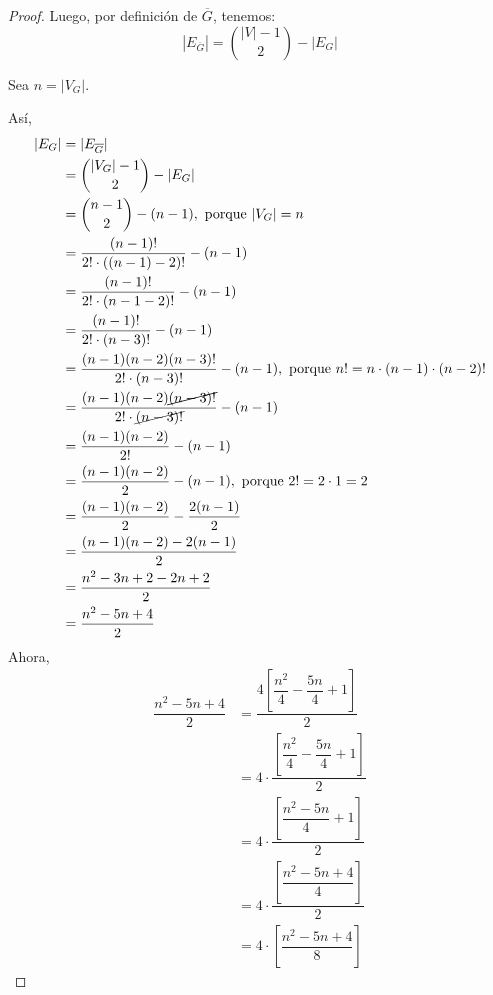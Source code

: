 \documentclass{article}
\begin{document}
\begin{enumerate}
\begin{enumerate}
\begin{proof}
          Luego, por definición de $\overline{G}$, tenemos:
          $$|E_{\overline{G}}| = \binom{|V| - 1}{2} - |E_{G}|$$

          Sea $n = |V_{G}|$.

          Así,
          \begin{align*}
            |E_{G}|
            & = |E_{\overline{G}}| \\
            & = \binom{|V_{G}| - 1}{2} - |E_{G}| \\
            & =  \binom{n - 1}{2} - (n - 1), \text{ porque $|V_{G}| = n$} \\
            & = \dfrac{(n - 1)!}{2! \cdot ((n - 1) - 2)!} - (n - 1) \\
            & = \dfrac{(n - 1)!}{2! \cdot (n - 1 - 2)!} - (n - 1) \\
            & = \dfrac{(n - 1)!}{2! \cdot (n - 3)!} - (n - 1) \\
            & = \dfrac{(n - 1)(n - 2)(n - 3)!}{2! \cdot (n - 3)!} - (n - 1), \text{ porque $n! = n \cdot (n - 1) \cdot (n - 2)!$} \\
            & = \dfrac{(n - 1)(n - 2) \cancel{(n - 3)!}}{2! \cdot \cancel{(n - 3)!}} - (n - 1) \\
            & = \dfrac{(n - 1)(n - 2)}{2!} - (n - 1) \\
            & = \dfrac{(n - 1)(n - 2)}{2} - (n - 1), \text{ porque $2! = 2 \cdot 1 = 2$} \\
            & = \dfrac{(n - 1)(n - 2)}{2} - \dfrac{2(n - 1)}{2} \\
            & = \dfrac{(n - 1)(n - 2) - 2(n - 1)}{2} \\
            & = \dfrac{n^{2} - 3n + 2 - 2n + 2}{2} \\
            & = \dfrac{n^{2} - 5n + 4}{2}
          \end{align*}
          Ahora,
          \begin{align*}
            \dfrac{n^{2} - 5n + 4}{2}
            & = \dfrac{4 \left[\dfrac{n^{2}}{4} - \dfrac{5n}{4} + 1 \right]}{2} \\
            & = 4 \cdot \dfrac{\left[\dfrac{n^{2}}{4} - \dfrac{5n}{4} + 1 \right]}{2} \\
            & = 4 \cdot \dfrac{\left[\dfrac{n^{2} - 5n}{4} + 1 \right]}{2} \\
            & = 4 \cdot \dfrac{\left[\dfrac{n^{2} - 5n + 4}{4} \right]}{2} \\
            & = 4 \cdot \left[\dfrac{n^{2} - 5n + 4}{8} \right]
          \end{align*}


\end{proof}
\end{enumerate}
\end{enumerate}
\end{document}
